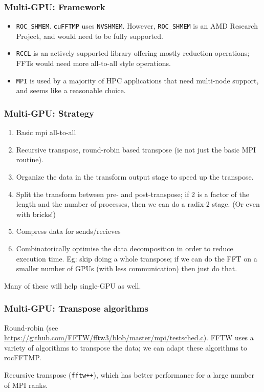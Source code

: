 \documentclass[10pt,aspectratio=169]{beamer}
\begin{document}
\begin{frame}
  \frametitle{Multi-GPU: Framework}

  \begin{itemize}
  \item \texttt{ROC_SHMEM}.  \texttt{cuFFTMP} uses \texttt{NVSHMEM}.
    However, \texttt{ROC_SHMEM} is an AMD Research Project, and would
    need to be fully supported.
    \item \texttt{RCCL} is an actively supported library offering
      mostly reduction operations; FFTs would need more all-to-all
      style operations.
    \item \texttt{MPI} is used by a majority of HPC applications that need
      multi-node support, and seems like a reasonable choice.
  \end{itemize}
  
\end{frame}
  
\begin{frame}
    \frametitle{Multi-GPU: Strategy}

    \begin{enumerate}
      \item Basic mpi all-to-all
      \item Recursive transpose, round-robin based transpose (ie not
        just the basic MPI routine).
      \item Organize the data in the transform output stage to speed
        up the transpose.
      \item Split the transform between pre- and post-transpose; if 2
        is a factor of the length and the number of processes, then we
        can do a radix-2 stage.  (Or even with bricks!)
      \item Compress data for sends/recieves
      \item Combinatorically optimise the data decomposition in order
        to reduce execution time.  Eg: skip doing a whole transpose;
        if we can do the FFT on a smaller number of GPUs (with less
        communication) then just do that.
    \end{enumerate}

    \bigskip
    
    Many of these will help single-GPU as well.
    
\end{frame}

\begin{frame}
  \frametitle{Multi-GPU: Transpose algorithms}

  Round-robin (see
  \url{https://github.com/FFTW/fftw3/blob/master/mpi/testsched.c}).
  FFTW uses a variety of algorithms to transpose the data; we can
  adapt these algorithms to rocFFTMP.

  \bigskip
  
  Recursive transpose (\texttt{fftw++}), which has better performance
  for a large number of MPI ranks.
  
\end{frame}
  
\end{document}
